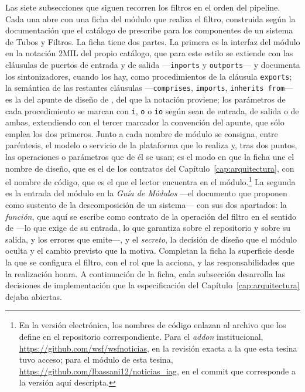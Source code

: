 \documentclass[12pt]{report}
\begin{document}
Las siete subsecciones que siguen recorren los filtros en el orden del pipeline. Cada una abre con una ficha del módulo que realiza el filtro, construida según la documentación que el catálogo de \citet[\S3.11]{cristia:2025} prescribe para los componentes de un sistema de Tubos y Filtros. La ficha tiene dos partes. La primera es la interfaz del módulo en la notación 2MIL del propio catálogo, que para este estilo se extiende con las cláusulas de puertos de entrada y de salida ---\texttt{inports} y \texttt{outports}--- y documenta los sintonizadores, cuando los hay, como procedimientos de la cláusula \texttt{exports}; la semántica de las restantes cláusulas ---\texttt{comprises}, \texttt{imports}, \texttt{inherits from}--- es la del apunte de diseño de \citet{cristia:2026}, del que la notación proviene; los parámetros de cada procedimiento se marcan con \texttt{i}, \texttt{o} o \texttt{io} según sean de entrada, de salida o de ambas, extendiendo con el tercer marcador la convención del apunte, que sólo emplea los dos primeros. Junto a cada nombre de módulo se consigna, entre paréntesis, el modelo o servicio de la plataforma que lo realiza y, tras dos puntos, las operaciones o parámetros que de él se usan; es el modo en que la ficha une el nombre de diseño, que es el de los contratos del Capítulo~\ref{cap:arquitectura}, con el nombre de código, que es el que el lector encuentra en el módulo.\footnote{En la versión electrónica, los nombres de código enlazan al archivo que los define en el repositorio correspondiente. Para el \textit{addon} institucional, \url{https://github.com/wsf/wsfnoticias}, en la revisión exacta a la que esta tesina tuvo acceso; para el módulo de esta tesina, \url{https://github.com/lbassani12/noticias_iag}, en el commit que corresponde a la versión aquí descripta.}
La segunda es la entrada del módulo en la \textit{Guía de Módulos} ---el documento que \citet{parnasetal:1985} proponen como sustento de la descomposición de un sistema--- con sus dos apartados: la \textit{función}, que aquí se escribe como contrato de la operación del filtro en el sentido de \citet{meyer:1992} ---lo que exige de su entrada, lo que garantiza sobre el repositorio y sobre su salida, y los errores que emite---, y el \textit{secreto}, la decisión de diseño que el módulo oculta y el cambio previsto que la motiva. Completan la ficha la superficie desde la que se configura el filtro, con el rol que la acciona, y las responsabilidades que la realización honra. A continuación de la ficha, cada subsección desarrolla las decisiones de implementación que la especificación del Capítulo~\ref{cap:arquitectura} dejaba abiertas.
\end{document}
